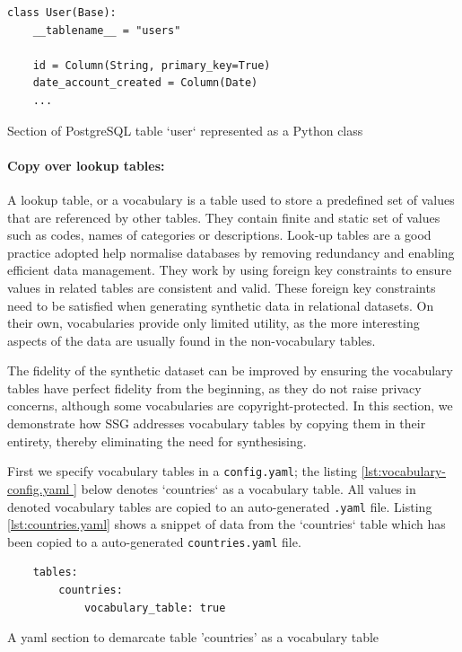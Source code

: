 \documentclass[11pt]{article}
\begin{document}
\begin{listing}[H]
\begin{verbatim}
class User(Base):
    __tablename__ = "users"

    id = Column(String, primary_key=True)
    date_account_created = Column(Date)
    ...
\end{verbatim}
\caption{Section of PostgreSQL table `user` represented as a Python class}
\label{lst:orm.py}
\end{listing}

\paragraph{Copy over lookup tables: }

A lookup table, or a vocabulary is a table used to store a predefined set of values that are referenced by other tables. They contain finite and static set of values such as codes, names of categories or descriptions. Look-up tables are a good practice adopted help normalise databases by removing redundancy and enabling efficient data management. They work by using foreign key constraints to ensure values in related tables are consistent and valid. These foreign key constraints need to be satisfied when generating synthetic data in relational datasets. On their own, vocabularies provide only limited utility, as the more interesting aspects of the data are usually found in the non-vocabulary tables. 

The fidelity of the synthetic dataset can be improved by ensuring the vocabulary tables have perfect fidelity from the beginning, as they do not raise privacy concerns, although some vocabularies are copyright-protected. In this section, we demonstrate how SSG addresses vocabulary tables by copying them in their entirety, thereby eliminating the need for synthesising.

First we specify vocabulary tables in a \texttt{config.yaml}; the listing \ref{lst:vocabulary-config.yaml } below denotes `countries` as a vocabulary table. All values in denoted vocabulary tables are copied to an auto-generated \texttt{.yaml} file. Listing \ref{lst:countries.yaml} shows a snippet of data from the `countries` table which has been copied to a auto-generated \texttt{countries.yaml} file.

\begin{listing}[H]
\begin{verbatim}
    tables:
        countries:
            vocabulary_table: true
\end{verbatim}
\caption{A yaml section to demarcate table 'countries' as a vocabulary table}
\label{lst:vocabulary-config.yaml }
\end{listing}
\end{document}
